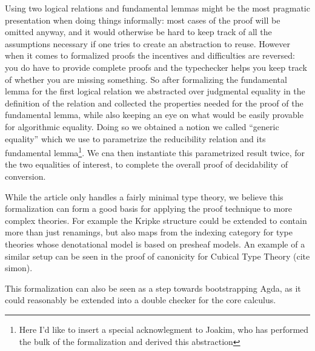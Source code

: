 \documentclass{book}
\begin{document}
Using two logical relations and fundamental lemmas might be the most
pragmatic presentation when doing things informally: most cases of the
proof will be omitted anyway, and it would otherwise be hard to keep
track of all the assumptions necessary if one tries to create an
abstraction to reuse. However when it comes to formalized proofs the
incentives and difficulties are reversed: you do have to provide
complete proofs and the typechecker helps you keep track of whether
you are missing something. So after formalizing the fundamental lemma
for the first logical relation we abstracted over judgmental equality
in the definition of the relation and collected the properties needed
for the proof of the fundamental lemma, while also keeping an eye on
what would be easily provable for algorithmic equality.  Doing so we
obtained a notion we called ``generic equality'' which we use to
parametrize the reducibility relation and its fundamental
lemma\footnote{Here I'd like to insert a special acknowlegment to
  Joakim, who has performed the bulk of the formalization and derived
  this abstraction}. We cna then instantiate this parametrized result
twice, for the two equalities of interest, to complete the overall
proof of decidability of conversion.


While the article only handles a fairly minimal type theory, we
believe this formalization can form a good basis for applying the
proof technique to more complex theories. For example the Kripke
structure could be extended to contain more than just renamings, but
also maps from the indexing category for type theories whose
denotational model is based on presheaf models. An example of a
similar setup can be seen in the proof of canonicity for Cubical Type
Theory (cite simon).

This formalization can also be seen as a step towards bootstrapping
Agda, as it could reasonably be extended into a double checker for the
core calculus.
\end{document}
